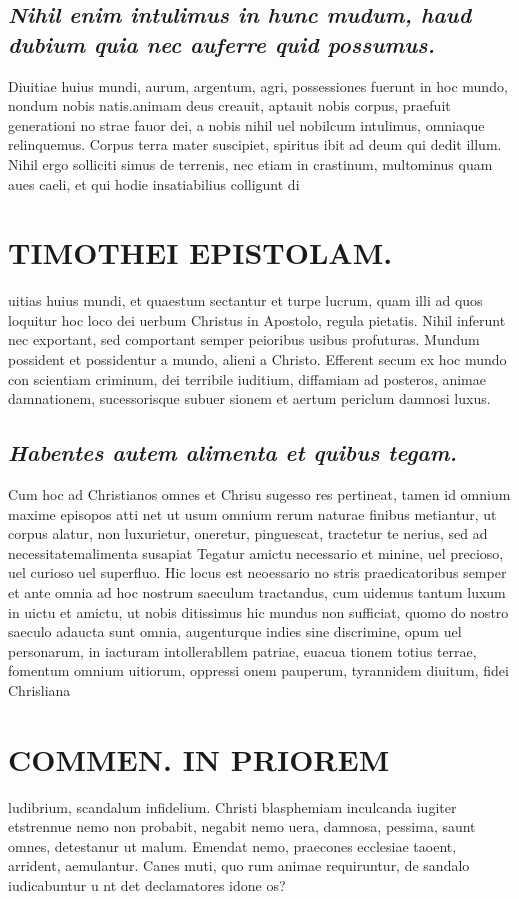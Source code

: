 \documentclass{article}
\begin{document}
\begin{pages}
\subsection*{\textit{Nihil enim intulimus in hunc mudum, haud dubium quia nec auferre quid possumus. }}\pstart Diuitiae huius mundi, aurum, argentum, agri, possessiones fuerunt in hoc mundo, nondum nobis natis.animam deus creauit, aptauit nobis corpus, praefuit generationi no strae fauor dei, a nobis nihil uel nobilcum intulimus, omniaque relinquemus. Corpus terra mater suscipiet, spiritus ibit ad deum qui dedit illum. Nihil ergo solliciti simus de terrenis, nec etiam in crastinum, multominus quam aues caeli, et qui hodie insatiabilius colligunt di  \pend
\section*{TIMOTHEI EPISTOLAM. }
\marginpar{[ p.163 ]}\pstart uitias huius mundi, et quaestum sectantur et turpe lucrum, quam illi ad quos loquitur hoc loco dei uerbum Christus in Apostolo, regula pietatis. Nihil inferunt nec exportant, sed comportant semper peioribus usibus profuturas. Mundum possident et possidentur a mundo, alieni a Christo. Efferent secum ex hoc mundo con scientiam criminum, dei terribile iuditium, diffamiam ad posteros, animae damnationem, sucessorisque subuer sionem et aertum periclum damnosi luxus.  \pend
{}
{}
\subsection*{\textit{Habentes autem alimenta et quibus tegam. }}\pstart Cum hoc ad Christianos omnes et Chrisu sugesso res pertineat, tamen id omnium maxime episopos atti net ut usum omnium rerum naturae finibus metiantur, ut corpus alatur, non luxurietur, oneretur, pinguescat, tractetur te nerius, sed ad necessitatemalimenta susapiat Tegatur amictu necessario et minine, uel precioso, uel curioso uel superfluo. Hic locus est neoessario no stris praedicatoribus semper et ante omnia ad hoc nostrum saeculum tractandus, cum uidemus tantum luxum in uictu et amictu, ut nobis ditissimus hic mundus non sufficiat, quomo do nostro saeculo adaucta sunt omnia, augenturque indies sine discrimine, opum uel personarum, in iacturam intollerabllem patriae, euacua tionem totius terrae, fomentum omnium uitiorum, oppressi onem pauperum, tyrannidem diuitum, fidei Chrisliana  \pend
\section*{COMMEN. IN PRIOREM }
\marginpar{[ p.164 ]}\pstart ludibrium, scandalum infidelium. Christi blasphemiam inculcanda iugiter etstrennue nemo non probabit, negabit nemo uera, damnosa, pessima, saunt omnes, detestanur ut malum. Emendat nemo, praecones ecclesiae taoent, arrident, aemulantur. Canes muti, quo rum animae requiruntur, de sandalo iudicabuntur u nt det declamatores idone os?  \pend
{}
{}

\end{pages}
\end{document}
